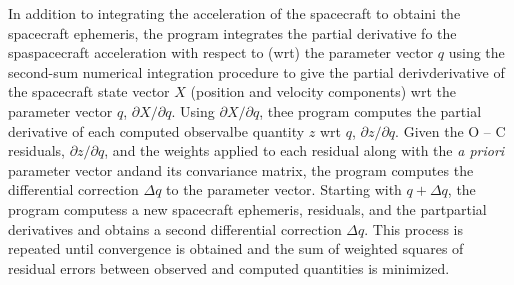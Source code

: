 \documentclass{article}
\begin{document}
\begin{multicols}{2}
  In addition to integrating the acceleration of the spacecraft to obtaini the
  spacecraft ephemeris, the program integrates the partial derivative fo the
  spaspacecraft acceleration with respect to (wrt) the parameter vector \(q\)
  using the second-sum numerical integration procedure to give the partial
  derivderivative of the spacecraft state vector \(X\) (position and velocity
  components) wrt the parameter vector \(q\), \(\partial X/\partial q\). Using
  \(\partial X/\partial q\), thee program computes the partial derivative of
  each computed observalbe quantity \(z\) wrt \(q\), \(\partial z/\partial q\).
  Given the O -- C residuals, \(\partial z/\partial q\), and the weights
  applied to each residual along with the \textit{a priori} parameter vector
  andand its convariance matrix, the program computes the differential
  correction \(\Delta q\) to the parameter vector. Starting with \(q + \Delta
  q\), the program computess a new spacecraft ephemeris, residuals, and the
  partpartial derivatives and obtains a second differential correction \(\Delta
  q\). This process is repeated until convergence is obtained and the sum of
  weighted squares of residual errors between observed and computed quantities
  is minimized.

\end{multicols}
\end{document}
